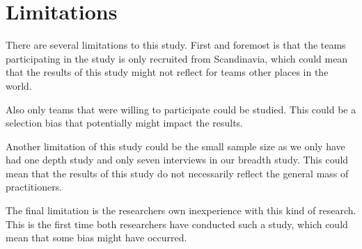 \section{Limitations}
There are several limitations to this study. First and foremost is that the teams participating in the study is only recruited from Scandinavia, which could mean that the results of this study might not reflect for teams other places in the world. 

Also only teams that were willing to participate could be studied. This could be a selection bias that potentially might impact the results.

Another limitation of this study could be the small sample size as we only have had one depth study and only seven interviews in our breadth study. This could mean that the results of this study do not necessarily reflect the general mass of practitioners. 

The final limitation is the researchers own inexperience with this kind of research. This is the first time both researchers have conducted such a study, which could mean that some bias might have occurred.